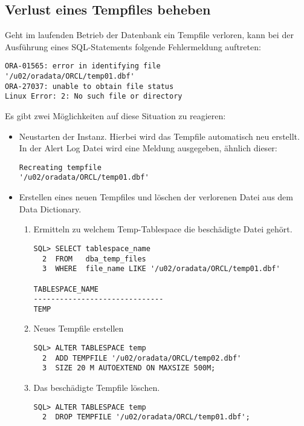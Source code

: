       \subsection{Verlust eines Tempfiles beheben}
        Geht im laufenden Betrieb der Datenbank ein Tempfile verloren, kann bei der Ausführung eines SQL-Statements folgende Fehlermeldung auftreten:
        \begin{lstlisting}[caption={Verlust eines Tempfiles},label=admin1429,language=oracle_sql]
ORA-01565: error in identifying file
'/u02/oradata/ORCL/temp01.dbf'
ORA-27037: unable to obtain file status
Linux Error: 2: No such file or directory
        \end{lstlisting}
        Es gibt zwei Möglichkeiten auf diese Situation zu reagieren:
        \begin{itemize}
          \item Neustarten der Instanz. Hierbei wird das Tempfile automatisch neu erstellt. In der Alert Log Datei wird eine Meldung ausgegeben, ähnlich dieser:
          \begin{lstlisting}[caption={Automatisches Neuerstellen eines Tempfiles},label=admin1430,language=oracle_sql]
Recreating tempfile
'/u02/oradata/ORCL/temp01.dbf'
          \end{lstlisting}
          \item Erstellen eines neuen Tempfiles und löschen der verlorenen Datei aus dem Data Dictionary.
            \begin{enumerate}
              \item Ermitteln zu welchem Temp-Tablespace die beschädigte Datei gehört.
                \begin{lstlisting}[caption={Ermitteln des richtigen Temp-Tablespace},label=admin1431,language=oracle_sql]
SQL> SELECT tablespace_name
  2  FROM   dba_temp_files
  3  WHERE  file_name LIKE '/u02/oradata/ORCL/temp01.dbf'

TABLESPACE_NAME
------------------------------
TEMP
                \end{lstlisting}
              \item Neues Tempfile erstellen
              \begin{lstlisting}[caption={Neues Tempfile erstellen},label=admin1432,language=oracle_sql]
SQL> ALTER TABLESPACE temp
  2  ADD TEMPFILE '/u02/oradata/ORCL/temp02.dbf'
  3  SIZE 20 M AUTOEXTEND ON MAXSIZE 500M;
              \end{lstlisting}
              \item Das beschädigte Tempfile löschen.
              \begin{lstlisting}[caption={Beschädigtes Tempfile löschen},label=admin1433,language=oracle_sql]
SQL> ALTER TABLESPACE temp
  2  DROP TEMPFILE '/u02/oradata/ORCL/temp01.dbf';
              \end{lstlisting}
            \end{enumerate}
        \end{itemize}
